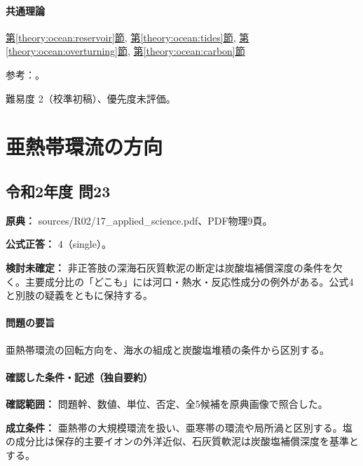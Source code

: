 \paragraph{共通理論} \hyperref[theory:ocean:reservoir]{第\ref*{theory:ocean:reservoir}節}, \hyperref[theory:ocean:tides]{第\ref*{theory:ocean:tides}節}, \hyperref[theory:ocean:overturning]{第\ref*{theory:ocean:overturning}節}, \hyperref[theory:ocean:carbon]{第\ref*{theory:ocean:carbon}節}

\par 参考：\cite{usgs_ocean_water_volume,noaa_tidal_patterns,noaa_subtropical_ecco,noaa_overturning,noaa_carbon_chemistry}。

\par 難易度 2（校準初稿）、優先度未評価。

\section{亜熱帯環流の方向}

\subsection{令和2年度 問23}
\label{q:r02-reg-applied-23}

\noindent\textbf{原典：} sources/R02/17\_applied\_science.pdf、PDF物理9頁。

\textbf{公式正答：} 4（single）。

\par\textbf{検討未確定：} 非正答肢の深海石灰質軟泥の断定は炭酸塩補償深度の条件を欠く。主要成分比の「どこも」には河口・熱水・反応性成分の例外がある。公式4と別肢の疑義をともに保持する。

\paragraph{問題の要旨} 亜熱帯環流の回転方向を、海水の組成と炭酸塩堆積の条件から区別する。

\paragraph{確認した条件・記述（独自要約）}\mbox{}\par

\noindent\textbf{確認範囲：} 問題幹、数値、単位、否定、全5候補を原典画像で照合した。\par

\noindent\textbf{成立条件：} 亜熱帯の大規模環流を扱い、亜寒帯の環流や局所渦と区別する。塩の成分比は保存的主要イオンの外洋近似、石灰質軟泥は炭酸塩補償深度を基準とする。\par

